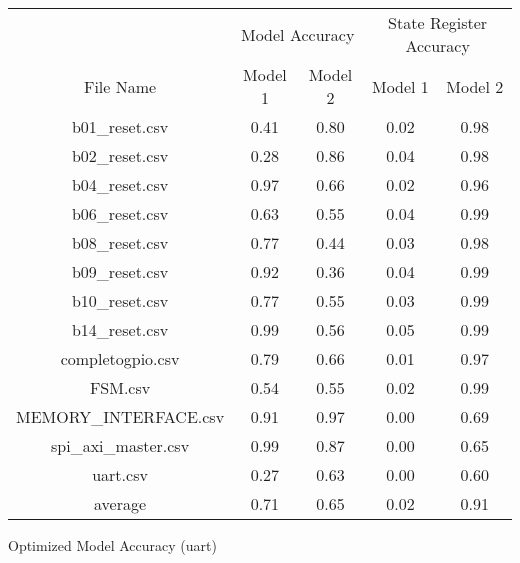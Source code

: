 \bigskip\begin{tabular}{|c|c|c|c|c|}
    \hline
     & \multicolumn{2}{c|}{Model Accuracy} & \multicolumn{2}{c|}{State Register Accuracy}\\
    \cline {2-5}
    File Name & Model 1 & Model 2 & Model 1 & Model 2\\
    \hline
    \hline
    b01\_reset.csv & 0.41 & 0.80 & 0.02 & 0.98\\
    \hline
    b02\_reset.csv & 0.28 & 0.86 & 0.04 & 0.98\\
    \hline
    b04\_reset.csv & 0.97 & 0.66 & 0.02 & 0.96\\
    \hline
    b06\_reset.csv & 0.63 & 0.55 & 0.04 & 0.99\\
    \hline
    b08\_reset.csv & 0.77 & 0.44 & 0.03 & 0.98\\
    \hline
    b09\_reset.csv & 0.92 & 0.36 & 0.04 & 0.99\\
    \hline
    b10\_reset.csv & 0.77 & 0.55 & 0.03 & 0.99\\
    \hline
    b14\_reset.csv & 0.99 & 0.56 & 0.05 & 0.99\\
    \hline
    completogpio.csv & 0.79 & 0.66 & 0.01 & 0.97\\
    \hline
    FSM.csv & 0.54 & 0.55 & 0.02 & 0.99\\
    \hline
    MEMORY\_INTERFACE.csv & 0.91 & 0.97 & 0.00 & 0.69\\
    \hline
    spi\_axi\_master.csv & 0.99 & 0.87 & 0.00 & 0.65\\
    \hline
    uart.csv & 0.27 & 0.63 & 0.00 & 0.60\\
    \hline
    \hline
    average & 0.71 & 0.65 & 0.02 & 0.91\\
    \hline
\end{tabular}
\caption{Optimized Model Accuracy (uart)}
\label{tab:Optimized Model Accuracy (uart)}